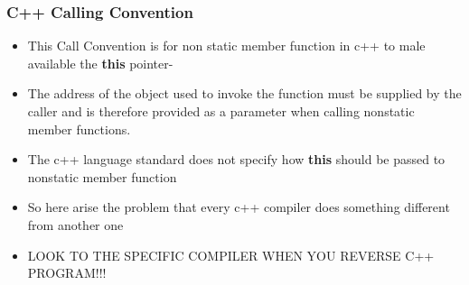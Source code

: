 \documentclass[]{beamer}
\begin{document}
		\begin{frame}
			\frametitle{C++ Calling Convention}
			\begin{itemize}
				\item{This Call Convention is for non static member function in c++ to male available the \textbf{this} pointer-}
				\item{The address of the object used to invoke the function must be supplied by the caller and is therefore provided as a parameter when calling nonstatic member functions.}
				\item{The c++ language standard does not specify how \textbf{this} should be passed to nonstatic member function}
				\item{So here arise the problem that every c++ compiler does something different from another one}
				\item{\color{red} LOOK TO THE SPECIFIC COMPILER WHEN YOU REVERSE C++ PROGRAM!!!}
			\end{itemize}
		\end{frame}
\end{document}
